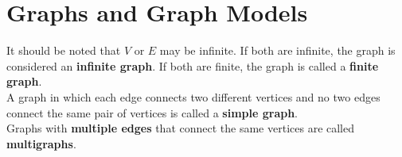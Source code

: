\documentclass[./Discrete Math.tex]{subfiles}
\begin{document}
	\section{Graphs and Graph Models}
		It should be noted that \(V\) or \(E\) may be infinite. If both are infinite, the graph is considered an \textbf{infinite graph}. If both are finite, the graph is called a \textbf{finite graph}. \\
		A graph in which each edge connects two different vertices and no two edges connect the same pair of vertices is called a \textbf{simple graph}. \\
		Graphs with \textbf{multiple edges} that connect the same vertices are called \textbf{multigraphs}.
\end{document}
